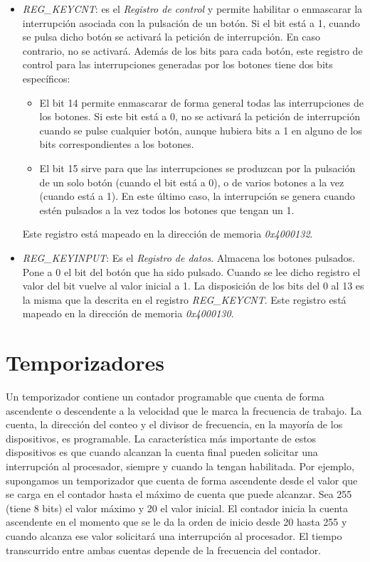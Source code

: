 \begin{itemize}
	\item \textit{REG\_KEYCNT}: es el \textit{Registro de control} y permite habilitar o enmascarar la interrupción asociada con la pulsación de un botón. Si el bit está a 1, cuando se pulsa dicho botón se activará la petición de interrupción. En caso contrario, no se activará.
	Además de los bits para cada botón, este registro de control para las interrupciones generadas por los botones tiene dos bits específicos:
	\begin{itemize}
		\item El bit 14 permite enmascarar de forma general todas las interrupciones de los botones. Si este bit está a 0, no se activará la petición de interrupción cuando se pulse cualquier botón, aunque hubiera bits a 1 en alguno de los bits correspondientes a los botones.
		\item El bit 15 sirve para que las interrupciones se produzcan por la pulsaci\'on de un solo bot\'on (cuando el bit est\'a a 0), o de varios botones a la vez (cuando est\'a a 1). En este \'ultimo caso, la interrupci\'on se genera cuando est\'en pulsados a la vez todos los botones que tengan un 1.
	\end{itemize}
	Este registro está mapeado en la dirección de memoria \textit{0x4000132}.
	\item \textit{REG\_KEYINPUT}: Es el \textit{Registro de datos}. Almacena los botones pulsados. Pone a 0 el bit del botón que ha sido pulsado. Cuando se lee dicho registro el valor del bit vuelve  al valor inicial a 1. La disposici\'on de los bits del 0 al 13 es la misma que la descrita en el registro \textit{REG\_KEYCNT}.
	Este registro está mapeado en la dirección de memoria \textit{0x4000130}.
\end{itemize}

\section{Temporizadores}
Un temporizador contiene un contador programable que cuenta de forma ascendente o descendente  a la velocidad que le marca la frecuencia de trabajo. La cuenta, la dirección del conteo y el divisor de frecuencia, en la mayoría de los dispositivos, es programable. La característica  más importante de estos dispositivos es que cuando alcanzan la cuenta final  pueden solicitar una interrupción al procesador, siempre y cuando la tengan habilitada.  Por ejemplo, supongamos un temporizador que cuenta de forma ascendente desde el valor que se carga en el contador hasta el máximo de cuenta que puede alcanzar. Sea 255 (tiene 8 bits) el valor  máximo  y  20 el valor inicial. El contador inicia la cuenta ascendente en el momento que se le da la orden de inicio  desde 20 hasta  255  y cuando alcanza ese valor solicitará una interrupción al procesador. El tiempo transcurrido entre ambas cuentas  depende de la frecuencia del contador. 

